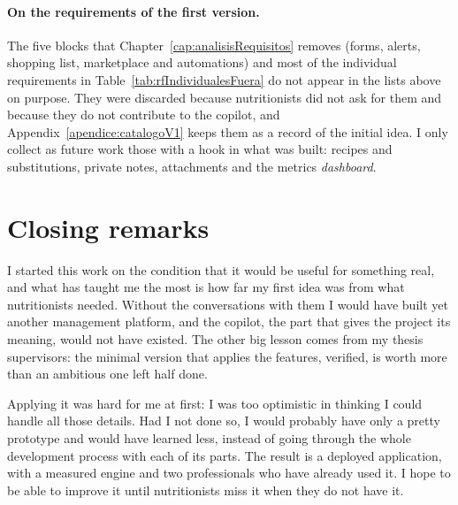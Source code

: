 \paragraph{On the requirements of the first version.} The five blocks that Chapter~\ref{cap:analisisRequisitos} removes (forms, alerts, shopping list, marketplace and automations) and most of the individual requirements in Table~\ref{tab:rfIndividualesFuera} do not appear in the lists above on purpose. They were discarded because nutritionists did not ask for them and because they do not contribute to the copilot, and Appendix~\ref{apendice:catalogoV1} keeps them as a record of the initial idea. I only collect as future work those with a hook in what was built: recipes and substitutions, private notes, attachments and the metrics \textit{dashboard}.

\section*{Closing remarks}
\label{sec:closing}

I started this work on the condition that it would be useful for something real, and what has taught me the most is how far my first idea was from what nutritionists needed. Without the conversations with them I would have built yet another management platform, and the copilot, the part that gives the project its meaning, would not have existed. The other big lesson comes from my thesis supervisors: the minimal version that applies the features, verified, is worth more than an ambitious one left half done.

Applying it was hard for me at first: I was too optimistic in thinking I could handle all those details. Had I not done so, I would probably have only a pretty prototype and would have learned less, instead of going through the whole development process with each of its parts. The result is a deployed application, with a measured engine and two professionals who have already used it. I hope to be able to improve it until nutritionists miss it when they do not have it.
